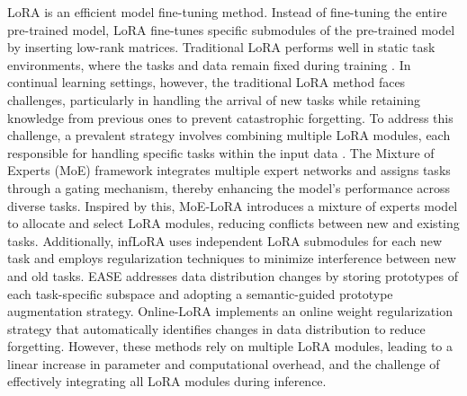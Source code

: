LoRA \cite{hu2021lora} is an efficient model fine-tuning method. Instead of fine-tuning the entire pre-trained model, LoRA fine-tunes specific submodules of the pre-trained model by inserting low-rank matrices. Traditional LoRA performs well in static task environments, where the tasks and data remain fixed during training \cite{hayou2024lora+,li2023loftq,kopiczko2023vera}. In continual learning settings, however, the traditional LoRA method faces challenges, particularly in handling the arrival of new tasks while retaining knowledge from previous ones to prevent catastrophic forgetting.
To address this challenge, a prevalent strategy involves combining multiple LoRA modules, each responsible for handling specific tasks within the input data \cite{wei2024online,zhou2024expandable,liang2024inflora}. The Mixture of Experts (MoE) \cite{jacobs1991adaptive,shazeer2017outrageously} framework integrates multiple expert networks and assigns tasks through a gating mechanism, thereby enhancing the model's performance across diverse tasks. Inspired by this, MoE-LoRA \cite{yu2024boosting} introduces a mixture of experts model to allocate and select LoRA modules, reducing conflicts between new and existing tasks. Additionally, infLoRA \cite{liang2024inflora} uses independent LoRA submodules for each new task and employs regularization techniques to minimize interference between new and old tasks. EASE \cite{zhou2024expandable} addresses data distribution changes by storing prototypes of each task-specific subspace and adopting a semantic-guided prototype augmentation strategy. Online-LoRA \cite{wei2024online} implements an online weight regularization strategy that automatically identifies changes in data distribution to reduce forgetting.
However, these methods rely on multiple LoRA modules, leading to a linear increase in parameter and computational overhead, and the challenge of effectively integrating all LoRA modules during inference.

